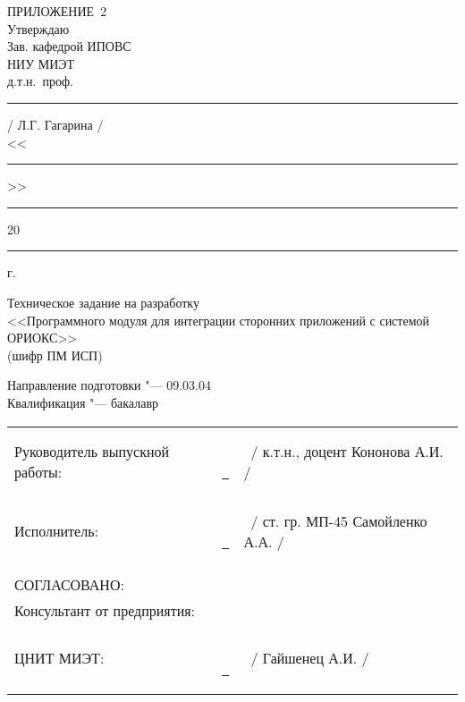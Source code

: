 \begin{flushright}
  ПРИЛОЖЕНИЕ~2
  ~\\
  Утверждаю \\
  Зав. кафедрой ИПОВС \\
  НИУ МИЭТ \\
  д.т.н.\ проф.\ \rule{3cm}{0.4pt} / Л.Г. Гагарина /\\
  <<\rule{0.8cm}{0.4pt}>> \rule{3cm}{0.4pt} 20\rule{0.8cm}{0.4pt}г. \\
\end{flushright}
\vfill
\begin{centering}
  Техническое задание на разработку\\
  <<Программного модуля для интеграции сторонних приложений с системой ОРИОКС>> \\
  (шифр ПМ ИСП) \\
\end{centering}
\vfill
\noindent
Направление подготовки "--- 09.03.04 \\
Квалификация "--- бакалавр
\vfill
\noindent
\begin{tabularx}{\textwidth}{l@{}X@{}l}
  Руководитель выпускной работы: & \ \rule{3.5cm}{0.4pt} & \ / к.т.н., доцент Кононова А.И. / \\[1ex]
  Исполнитель: & \ \rule{3.5cm}{0.4pt} & \ / ст. гр. МП-45 Самойленко А.А. / \\\\


  СОГЛАСОВАНО: & & \\
  Консультант от предприятия: & & \\
  ЦНИТ МИЭТ: & \ \rule{3.5cm}{0.4pt} & \ / Гайшенец А.И. / \\
\end{tabularx}

\vfill

\thispagestyle{empty}

\newpage
